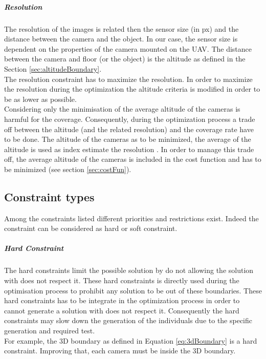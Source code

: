 \subparagraph{Resolution}
The resolution of the images is related then the sensor size (in px) and the distance between the camera and the object. In our case, the sensor size is dependent on the properties of the camera mounted on the UAV.%
 The distance between the camera and floor (or the object) is the altitude as  defined in the Section \ref{sec:altitudeBoundary}. \\
The resolution constraint has to maximize the resolution. In order to maximize the resolution during the optimization the altitude criteria is modified in order to be as lower as possible.\\
Considering only the minimisation of the average altitude of the cameras is harmful for the coverage.
Consequently, during the optimization process a trade off between the altitude (and the related resolution) and the coverage rate have to be done.
 The altitude of the cameras  as to be  minimized, the average of the altitude is used as index estimate the resolution  %
 . In order to manage this trade off, the average altitude of the cameras is included in the cost function  and has to be minimized (see section  \ref{sec:costFun}).  \\
 
\subsection{Constraint types}
 
Among the constraints listed different priorities and restrictions exist. Indeed the constraint can be considered as hard or soft constraint. %

\subparagraph{Hard Constraint}
 The hard constraints limit the possible solution by do not allowing the solution with does not respect it. These hard constraints is directly used during the optimisation process to prohibit any solution to be out of these boundaries. These hard constraints has to be integrate in the optimization process in order to cannot generate a solution with does not respect it. Consequently the hard constraints may slow down the generation of the individuals due to the specific generation and required test.\\ 
 For example, the 3D boundary as defined in Equation \ref{eq:3dBoundary} is a hard constraint. Improving that, each camera must be inside the 3D boundary.\\ %
 
